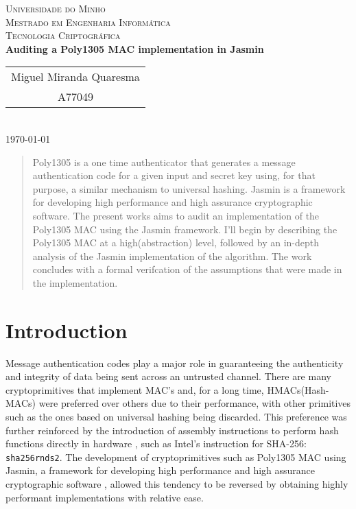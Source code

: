 \documentclass{article}
\begin{document}
{    
    \center
    \textsc{\Large Universidade do Minho} \\ [0.5cm]
    \textsc{\Large Mestrado em Engenharia Informática} \\ [0.5cm]
    \textsc{\large Tecnologia Criptográfica} \\ [0.5cm]
    
    {\LARGE \bfseries Auditing a Poly1305 MAC implementation in Jasmin} \\ [0.5cm]

    \begin{tabular}{c}
        Miguel Miranda Quaresma \\
        A77049 \\
    \end{tabular} \\ [0.5cm]

    \today \\ [1cm]
}

\begin{abstract}
    Poly1305 is a one time authenticator that generates a message authentication code for a given input and secret key using, for that purpose, a similar mechanism to
    universal hashing. Jasmin is a framework for developing high performance and high assurance cryptographic software. The present works aims to audit an implementation 
    of the Poly1305 MAC using the Jasmin framework. I'll begin by describing the Poly1305 MAC at a high(abstraction) level, followed by an in-depth analysis of the Jasmin 
    implementation of the algorithm. The work concludes with a formal verifcation of the assumptions that were made in the implementation.
\end{abstract}

\section{Introduction}
Message authentication codes play a major role in guaranteeing the authenticity and integrity of data being sent across an untrusted channel. There are many 
cryptoprimitives that implement MAC's and, for a long time, HMACs(Hash-MACs) were preferred over others due to their performance, with other primitives such 
as the ones based on universal hashing being discarded. This preference was further reinforced by the introduction of assembly instructions to perform hash 
functions directly in hardware \cite{sha_extensions}, such as Intel's instruction for SHA-256: \texttt{sha256rnds2}. The development of cryptoprimitives 
such as Poly1305 MAC using Jasmin, a framework for developing high performance and high assurance cryptographic software \cite{jasmin_paper}, allowed this tendency 
to be reversed by obtaining highly performant implementations with relative ease.
\end{document}
